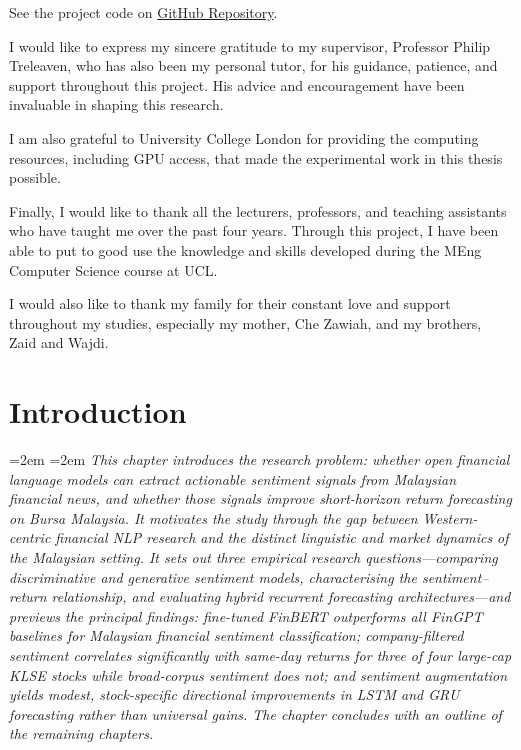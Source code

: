 \documentclass[12pt]{ucetd}
\newcommand{\chapterabstract}[1]{%
  \par\vspace{1em}
  \begingroup
  \leftskip=2em
  \rightskip=2em
  \noindent\itshape
  #1
  \par
  \endgroup
  \vspace{1.5em}
}
\begin{document}
\begin{center}
See the project code on
\href{https://github.com/anasamri12/finbert-vs-fingpt.git}{GitHub Repository}.
\end{center}


\acknowledgments

I would like to express my sincere gratitude to my supervisor, Professor Philip Treleaven, who has also been my personal tutor, for his guidance, patience, and support throughout this project. His advice and encouragement have been invaluable in shaping this research.

I am also grateful to University College London for providing the computing resources, including GPU access, that made the experimental work in this thesis possible.

Finally, I would like to thank all the lecturers, professors, and teaching assistants who have taught me over the past four years. Through this project, I have been able to put to good use the knowledge and skills developed during the MEng Computer Science course at UCL.

I would also like to thank my family for their constant love and support throughout my studies, especially my mother, Che Zawiah, and my brothers, Zaid and Wajdi.


\tableofcontents
\listoffigures
\listoftables



\mainmatter




\chapter{Introduction}


\chapterabstract{This chapter introduces the research problem: whether open financial language models can extract actionable sentiment signals from Malaysian financial news, and whether those signals improve short-horizon return forecasting on Bursa Malaysia. It motivates the study through the gap between Western-centric financial NLP research and the distinct linguistic and market dynamics of the Malaysian setting. It sets out three empirical research questions---comparing discriminative and generative sentiment models, characterising the sentiment--return relationship, and evaluating hybrid recurrent forecasting architectures---and previews the principal findings: fine-tuned FinBERT outperforms all FinGPT baselines for Malaysian financial sentiment classification; company-filtered sentiment correlates significantly with same-day returns for three of four large-cap KLSE stocks while broad-corpus sentiment does not; and sentiment augmentation yields modest, stock-specific directional improvements in LSTM and GRU forecasting rather than universal gains. The chapter concludes with an outline of the remaining chapters.}
\end{document}
